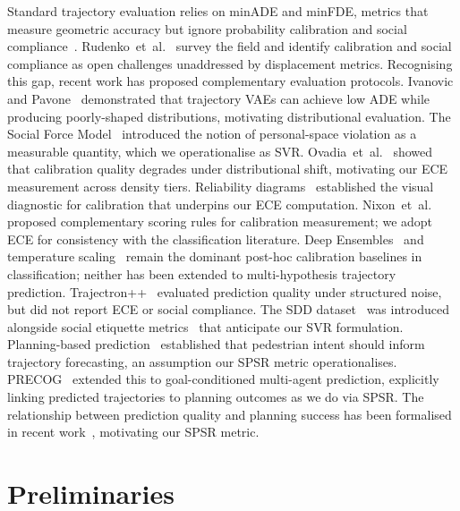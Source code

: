 \documentclass[journal]{IEEEtran}
\makeatletter
\newcommand{\etal}{et~al.\@}
\makeatother
\begin{document}
Standard trajectory evaluation relies on minADE and minFDE, metrics that measure geometric accuracy but ignore probability calibration and social compliance~\cite{alahi2016social,gupta2018social}. Rudenko~\etal~\cite{rudenko2020human} survey the field and identify calibration and social compliance as open challenges unaddressed by displacement metrics.
Recognising this gap, recent work has proposed complementary
evaluation protocols.
Ivanovic and Pavone~\cite{ivanovic2019trajectron} demonstrated that
trajectory VAEs can achieve low ADE while producing poorly-shaped
distributions, motivating distributional evaluation.
The Social Force Model~\cite{helbing1995social} introduced the notion
of personal-space violation as a measurable quantity, which we
operationalise as SVR.
Ovadia~\etal~\cite{ovadia2019can} showed that calibration quality
degrades under distributional shift, motivating our ECE measurement
across density tiers.
Reliability diagrams~\cite{niculescu2005predicting} established the visual diagnostic for calibration that underpins our ECE computation. Nixon~\etal~\cite{nixon2019measuring} proposed complementary scoring rules for calibration measurement; we adopt ECE for consistency with the classification literature.
Deep Ensembles~\cite{lakshminarayanan2017simple} and temperature
scaling~\cite{guo2017calibration} remain the dominant post-hoc
calibration baselines in classification; neither has been extended
to multi-hypothesis trajectory prediction.
Trajectron++~\cite{salzmann2020trajectron} evaluated prediction quality under structured noise, but did not report ECE or social compliance. The SDD dataset~\cite{mangalam2020pecnet} was introduced alongside social etiquette metrics~\cite{robicquet2016learning} that anticipate our SVR formulation. Planning-based prediction~\cite{ziebart2009planning} established that pedestrian intent should inform trajectory forecasting, an assumption our SPSR metric operationalises. PRECOG~\cite{rhinehart2019precog} extended this to goal-conditioned multi-agent prediction, explicitly linking predicted trajectories to planning outcomes as we do via SPSR. The relationship between prediction quality and planning success has been formalised in recent work~\cite{sun2022complementing}, motivating our SPSR metric.

\section{Preliminaries}
\label{sec:prelim}
\end{document}
